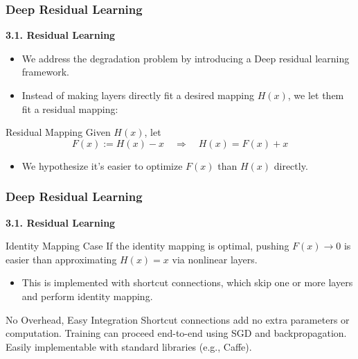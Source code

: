 \documentclass[
	11pt, %
]{beamer}
\begin{document}
\begin{frame}
	\frametitle{Deep Residual Learning}

	\textbf{3.1. Residual Learning}

	\begin{itemize}
		\item We address the degradation problem by introducing a Deep residual learning framework.
		\item Instead of making layers directly fit a desired mapping \( H(x) \), we let them fit a residual mapping:
	\end{itemize}

	\begin{exampleblock}{Residual Mapping}
		Given \( H(x) \), let  
		\[
		F(x) := H(x) - x \quad \Rightarrow \quad H(x) = F(x) + x
		\]
	\end{exampleblock}

	\begin{itemize}
		\item We hypothesize it's easier to optimize \( F(x) \) than \( H(x) \) directly.
	\end{itemize}
\end{frame}

\begin{frame}
	\frametitle{Deep Residual Learning}

	\textbf{3.1. Residual Learning}

	\begin{block}{Identity Mapping Case}
		If the identity mapping is optimal, pushing \( F(x) \rightarrow 0 \) is easier than approximating \( H(x) = x \) via nonlinear layers.
	\end{block}

	\begin{itemize}
		\item This is implemented with shortcut connections, which skip one or more layers and perform identity mapping.
	\end{itemize}

	\begin{alertblock}{No Overhead, Easy Integration}
		Shortcut connections add no extra parameters or computation.  
		Training can proceed end-to-end using SGD and backpropagation.  
		Easily implementable with standard libraries (e.g., Caffe).
	\end{alertblock}
\end{frame}
\end{document}
